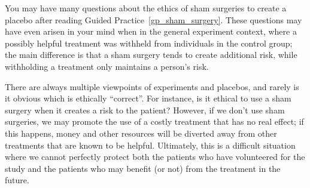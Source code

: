 You may have many questions about the ethics of
sham surgeries to create a placebo after reading
Guided Practice~\ref{gp_sham_surgery}.
These questions may have even arisen in your mind when
in the general experiment context, where a possibly
helpful treatment was withheld from individuals in the
control group;
the main difference is that a sham surgery tends to
create additional risk, while withholding a treatment
only maintains a person's risk.

There are always multiple viewpoints of experiments
and placebos, and rarely is it obvious which is
ethically ``correct''.
For instance, is it ethical to use a sham surgery
when it creates a risk to the patient?
However, if we don't use sham surgeries,
we may promote the use of a costly treatment that
has no real effect;
if this happens, money and other resources will be diverted
away from other treatments that are known to be helpful.
Ultimately, this is a difficult situation where
we cannot perfectly protect both the patients
who have volunteered for the study and the patients who
may benefit (or not) from the treatment in the future.


{}
